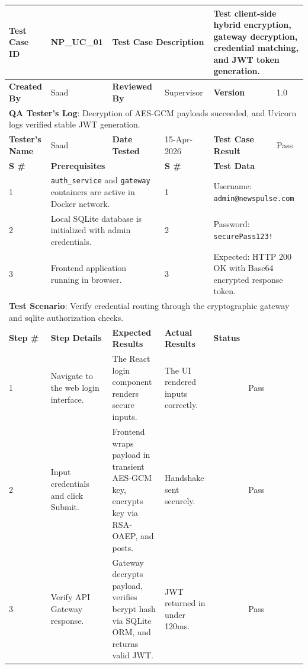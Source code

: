 \begin{longtable}{|l|p{3.0cm}|p{3.2cm}|p{3.2cm}|p{2.5cm}|p{1.0cm}|}
    \hline
    \textbf{Test Case ID} & NP\_UC\_01 & \multicolumn{2}{p{6.4cm}|}{\textbf{Test Case Description}} & \multicolumn{2}{p{3.5cm}|}{Test client-side hybrid encryption, gateway decryption, credential matching, and JWT token generation.} \\
    \hline
    \textbf{Created By} & Saad & \textbf{Reviewed By} & Supervisor & \textbf{Version} & 1.0 \\
    \hline
    \multicolumn{6}{|p{15.1cm}|}{\textbf{QA Tester's Log}: Decryption of AES-GCM payloads succeeded, and Uvicorn logs verified stable JWT generation.} \\
    \hline
    \textbf{Tester's Name} & Saad & \textbf{Date Tested} & 15-Apr-2026 & \textbf{Test Case Result} & Pass \\
    \hline
    \textbf{S \#} & \multicolumn{2}{p{6.2cm}|}{\textbf{Prerequisites}} & \textbf{S \#} & \multicolumn{2}{p{3.5cm}|}{\textbf{Test Data}} \\
    \hline
    1 & \multicolumn{2}{p{6.2cm}|}{\texttt{auth\_service} and \texttt{gateway} containers are active in Docker network.} & 1 & \multicolumn{2}{p{3.5cm}|}{Username: \texttt{admin@newspulse.com}} \\ \hline
    2 & \multicolumn{2}{p{6.2cm}|}{Local SQLite database is initialized with admin credentials.} & 2 & \multicolumn{2}{p{3.5cm}|}{Password: \texttt{securePass123!}} \\ \hline
    3 & \multicolumn{2}{p{6.2cm}|}{Frontend application running in browser.} & 3 & \multicolumn{2}{p{3.5cm}|}{Expected: HTTP 200 OK with Base64 encrypted response token.} \\ \hline
    \hline
    \multicolumn{6}{|p{15.1cm}|}{\textbf{Test Scenario}: Verify credential routing through the cryptographic gateway and sqlite authorization checks.} \\
    \hline
    \textbf{Step \#} & \textbf{Step Details} & \textbf{Expected Results} & \textbf{Actual Results} & \multicolumn{2}{p{3.5cm}|}{\textbf{Status}} \\
    \hline
        1 & Navigate to the web login interface. & The React login component renders secure inputs. & The UI rendered inputs correctly. & \multicolumn{2}{c|}{Pass} \\ \hline 
        2 & Input credentials and click Submit. & Frontend wraps payload in transient AES-GCM key, encrypts key via RSA-OAEP, and posts. & Handshake sent securely. & \multicolumn{2}{c|}{Pass} \\ \hline 
        3 & Verify API Gateway response. & Gateway decrypts payload, verifies bcrypt hash via SQLite ORM, and returns valid JWT. & JWT returned in under 120ms. & \multicolumn{2}{c|}{Pass} \\ \hline
    \hline
\end{longtable}

